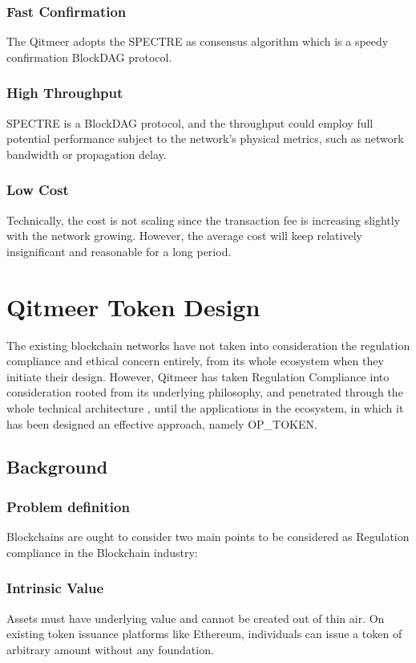 \documentclass[a4paper,11pt]{article}
\begin{document}
\subsubsection*{Fast Confirmation}
The Qitmeer adopts the SPECTRE as consensus algorithm which is a speedy confirmation BlockDAG protocol. 
\subsubsection*{High Throughput}
SPECTRE is a BlockDAG protocol, and the throughput could employ full potential performance subject to the network’s physical metrics, such as network bandwidth or propagation delay.
\subsubsection*{Low Cost}
Technically, the cost is not scaling since the transaction fee is increasing slightly with the network growing. However, the average cost will keep relatively insignificant and reasonable for a long period.  

\section{Qitmeer Token Design}
The existing blockchain networks have not taken into consideration the  regulation compliance and ethical concern entirely, from its whole ecosystem when they initiate their design. However, Qitmeer has taken Regulation Compliance into consideration rooted from its underlying philosophy, and penetrated through the whole technical architecture , until the applications in the ecosystem, in which it has been designed an effective approach, namely OP_TOKEN.

\subsection{Background}
\subsubsection{Problem definition}

Blockchains are ought to consider two main points to be considered as Regulation compliance in the Blockchain industry:

\subsubsection*{Intrinsic Value}
Assets must have underlying value and cannot be created out of thin air. On existing token issuance platforms like Ethereum\cite{Ethereum}, individuals can issue a token of arbitrary amount without any foundation.
 
\end{document}
